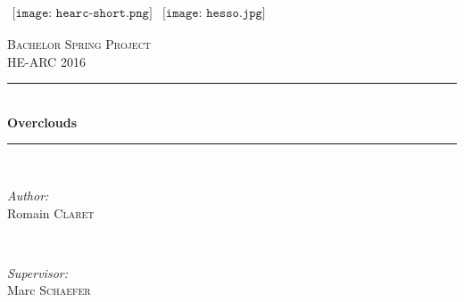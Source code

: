 \begin{titlepage}

\newcommand{\HRule}{\rule{\linewidth}{0.5mm}} %
\center %
\graphicspath{{logos/}} %
 
\begin{center}$
\begin{array}{cc}
\texttt{[image: hearc-short.png]} &
\texttt{[image: hesso.jpg]}
\end{array}$ \\[1cm]
\end{center}
\textsc{\Large Bachelor Spring Project} \\[0.5cm] %
\textsc{\large HE-ARC 2016} \\[0.5cm] %

\HRule \\[0.6cm]
{ \huge \bfseries Overclouds}\\[0.2cm]
\HRule \\[1cm]
 
\begin{minipage}{0.4\textwidth}
\begin{flushleft} \large
\emph{Author:}\\
Romain \textsc{Claret} %
\end{flushleft}
\end{minipage}
~
\begin{minipage}{0.4\textwidth}
\begin{flushright} \large
\emph{Supervisor:} \\
Marc \textsc{Schaefer} %
\end{flushright}
\end{minipage} \\[1.5cm]


\end{titlepage}
